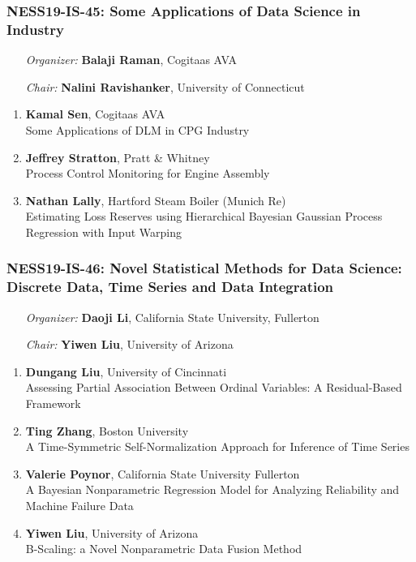 \subsubsection*{NESS19-IS-45: Some Applications of Data Science in Industry}

\begin{enumerate}[align=left]
\item [\emph{Organizer:}] \textbf{Balaji Raman}, Cogitaas AVA
\item [\emph{Chair:}] \textbf{Nalini Ravishanker},  University of Connecticut
\end{enumerate}

\begin{enumerate}
\item \textbf{Kamal Sen}, Cogitaas AVA \\
Some Applications of DLM in CPG Industry
\item \textbf{Jeffrey Stratton}, Pratt \& Whitney \\
Process Control Monitoring for Engine Assembly
\item \textbf{Nathan Lally}, Hartford Steam Boiler (Munich Re) \\
Estimating Loss Reserves using Hierarchical Bayesian Gaussian Process Regression with Input Warping
\end{enumerate}

\subsubsection*{NESS19-IS-46: Novel Statistical Methods for Data Science: Discrete Data, Time Series and Data Integration}

\begin{enumerate}[align=left]
\item [\emph{Organizer:}] \textbf{Daoji Li}, California State University, Fullerton
\item [\emph{Chair:}] \textbf{Yiwen Liu},  University of Arizona
\end{enumerate}

\begin{enumerate}
\item \textbf{Dungang Liu}, University of Cincinnati \\
Assessing Partial Association Between Ordinal Variables: A Residual-Based Framework
\item \textbf{Ting Zhang}, Boston University \\
A Time-Symmetric Self-Normalization Approach for Inference of Time Series
\item \textbf{Valerie Poynor}, California State University Fullerton \\
A Bayesian Nonparametric Regression Model for Analyzing Reliability and Machine Failure Data
\item \textbf{Yiwen Liu}, University of Arizona \\
B-Scaling: a Novel Nonparametric Data Fusion Method
\end{enumerate}

